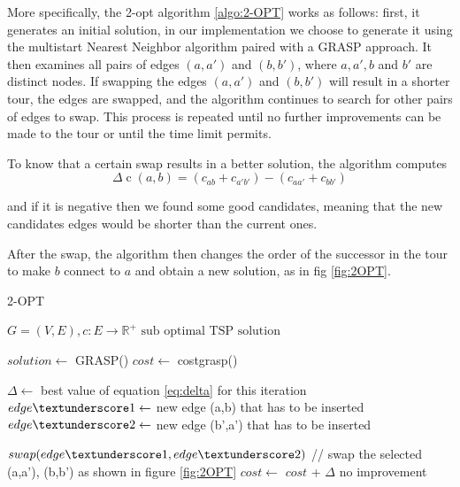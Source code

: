 More specifically, the 2-opt algorithm \ref{algo:2-OPT} works as follows: first, it generates an initial solution, in our implementation we choose to generate it using the multistart Nearest Neighbor algorithm paired with a GRASP approach. It then examines all pairs of edges $(a,a')$ and $(b,b')$, where $a,a',b$ and $b'$ are distinct nodes. If swapping the edges $(a,a')$ and $(b,b')$ will result in a shorter tour, the edges are swapped, and the algorithm continues to search for other pairs of edges to swap. This process is repeated until no further improvements can be made to the tour or until the time limit permits.

To know that a certain swap results in a better solution, the algorithm computes 
\begin{equation}\label{eq:delta}
\Delta \operatorname{c}(a,b) = (c_{ab} + c_{a'b'}) - (c_{aa'} + c_{bb'})
\end{equation}

and if it is negative then we found some good candidates, meaning that the new candidates edges would be shorter than the current ones.

After the swap, the algorithm then changes the order of the successor in the tour to make $b$ connect to $a$ and obtain a new solution, as in fig \ref{fig:2OPT}.

\begin{algorithm}[!h]
    \caption{2-OPT}\label{algo:2-OPT}
    \begin{algorithmic}[1]
    \Require $G = (V,E), c:E \to \mathbb{R}^+$
    \Ensure $\text{sub optimal TSP solution}$


    \State $solution \gets$ GRASP()
    \State $cost \gets$ cost\textunderscore grasp()
    

    
   
   
    \State $\Delta \gets$  best value of equation \ref{eq:delta} for this iteration
    \State $edge\textunderscore 1 \gets$ new edge (a,b) that has to be inserted
    \State $edge\textunderscore 2 \gets$ new edge (b',a') that has to be inserted
    
    
    \State $swap(edge\textunderscore 1,edge\textunderscore 2) $ // swap the selected (a,a'), (b,b') as shown in figure \ref{fig:2OPT}
    \State $cost \gets  $ $cost$ + $\Delta$
    \Else 
        \State no improvement
    \EndIf
    

    \EndWhile

    \end{algorithmic}
\end{algorithm}

